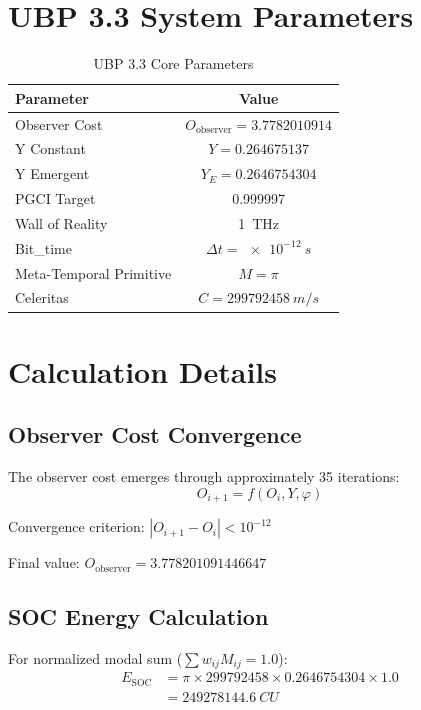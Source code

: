 \documentclass[12pt,a4paper]{article}
\begin{document}
\appendix

\section{UBP 3.3 System Parameters}

\begin{table}[h]
\centering
\caption{UBP 3.3 Core Parameters}
\begin{tabular}{lc}
\toprule
\textbf{Parameter} & \textbf{Value} \\
\midrule
Observer Cost & $O_{\text{observer}} = 3.7782010914$ \\
Y Constant & $Y = 0.264675137$ \\
Y Emergent & $Y_E = 0.2646754304$ \\
PGCI Target & 0.999997 \\
Wall of Reality & \SI{1}{THz} \\
Bit\_time & $\Delta t = \SI{e-12}{s}$ \\
Meta-Temporal Primitive & $M = \pi$ \\
Celeritas & $C = \SI{299792458}{m/s}$ \\
\bottomrule
\end{tabular}
\label{tab:parameters}
\end{table}

\section{Calculation Details}

\subsection{Observer Cost Convergence}

The observer cost emerges through approximately 35 iterations:
\begin{equation}
O_{i+1} = f(O_i, Y, \varphi)
\end{equation}

Convergence criterion: $|O_{i+1} - O_i| < 10^{-12}$

Final value: $O_{\text{observer}} = 3.778201091446647$

\subsection{SOC Energy Calculation}

For normalized modal sum ($\sum w_{ij} M_{ij} = 1.0$):
\begin{align}
E_{\text{SOC}} &= \pi \times 299792458 \times 0.2646754304 \times 1.0 \\
&= \SI{249278144.6}{CU}
\end{align}
\end{document}
